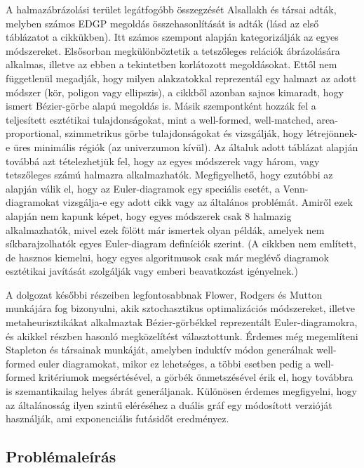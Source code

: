 A halmazábrázolási terület legátfogóbb összegzését Alsallakh és társai adták\cite{alsallakah2016_the_state_of_the_art_set_visualization}, melyben számos EDGP megoldás összehasonlítását is adták (lásd az első táblázatot a cikkükben). Itt számos szempont alapján kategorizálják az egyes módszereket. Elsősorban megkülönböztetik a tetszőleges relációk ábrázolására alkalmas, illetve az ebben a tekintetben korlátozott megoldásokat. Ettől nem függetlenül megadják, hogy milyen alakzatokkal reprezentál egy halmazt az adott módszer (kör, poligon vagy ellipszis), a cikkből azonban sajnos kimaradt, hogy ismert Bézier-görbe alapú megoldás is\cite{layout_metrics}. Másik szempontként hozzák fel a teljesített esztétikai tulajdonságokat, mint a well-formed, well-matched, area-proportional, szimmetrikus görbe tulajdonságokat és vizsgálják, hogy létrejönnek-e üres minimális régiók (az univerzumon kívül). Az általuk adott táblázat alapján továbbá azt tételezhetjük fel, hogy az egyes módszerek vagy három, vagy tetszőleges számú halmazra alkalmazhatók. Megfigyelhető, hogy ezutóbbi az alapján válik el, hogy az Euler-diagramok egy speciális esetét, a Venn-diagramokat vizsgálja-e egy adott cikk vagy az általános problémát. Amiről ezek alapján nem kapunk képet, hogy egyes módszerek csak 8 halmazig alkalmazhatók\cite{drawability_8_sets}, mivel ezek fölött már ismertek olyan példák\cite{simonetto_undrawable, drawability_8_sets, inductive_euler}, amelyek nem síkbarajzolhatók egyes Euler-diagram definíciók szerint. (A cikkben nem említett, de hasznos kiemelni, hogy egyes algoritmusok csak már meglévő diagramok esztétikai javítását szolgálják\cite{euler_force} vagy emberi beavatkozást igényelnek\cite{sketch_euler}.)

A dolgozat későbbi részeiben legfontosabbnak Flower, Rodgers és Mutton munkájára\cite{layout_metrics} fog bizonyulni, akik sztochasztikus optimalizációs módszereket, illetve metaheurisztikákat alkalmaztak Bézier-görbékkel reprezentált Euler-diagramokra, és akikkel részben hasonló megközelítést választottunk. Érdemes még megemlíteni Stapleton és társainak munkáját\cite{inductive_euler}, amelyben induktív módon generálnak well-formed euler diagramokat, mikor ez lehetséges, a többi esetben pedig a well-formed kritériumok megsértésével, a görbék önmetszésével érik el, hogy továbbra is szemantikailag helyes ábrát generáljanak. Különösen érdemes megfigyelni, hogy az általánosság ilyen szintű eléréséhez a duális gráf egy módosított verzióját használják, ami exponenciális futásidőt eredményez.

\subsection{Problémaleírás}

